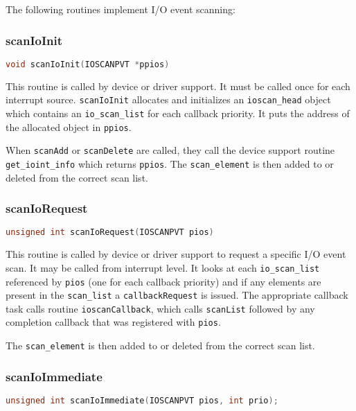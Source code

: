 The following routines implement I/O event scanning:

\subsubsection{scanIoInit}

\begin{lstlisting}[language=C]
void scanIoInit(IOSCANPVT *ppios)
\end{lstlisting}

This routine is called by device or driver support.
It must be called once for each interrupt source.
\verb|scanIoInit| allocates and initializes an \verb|ioscan_head| object which contains an \verb|io_scan_list| for each callback priority.
It puts the address of the allocated object in \verb|ppios|.

When \verb|scanAdd| or \verb|scanDelete| are called, they call the device support routine \verb|get_ioint_info| which returns \verb|ppios|.
The \verb|scan_element| is then added to or deleted from the correct scan list.

\subsubsection{scanIoRequest}

\begin{lstlisting}[language=C]
unsigned int scanIoRequest(IOSCANPVT pios)
\end{lstlisting}

This routine is called by device or driver support to request a specific I/O event scan.
It may be called from interrupt level.
It looks at each \verb|io_scan_list| referenced by \verb|pios| (one for each callback priority) and if any elements are present in the \verb|scan_list| a \verb|callbackRequest| is issued.
The appropriate callback task calls routine \verb|ioscanCallback|, which calls \verb|scanList| followed by any completion callback that was registered with \verb|pios|.

The \verb|scan_element| is then added to or deleted from the correct scan list.

\subsubsection{scanIoImmediate}

\begin{lstlisting}[language=C]
unsigned int scanIoImmediate(IOSCANPVT pios, int prio);
\end{lstlisting}

